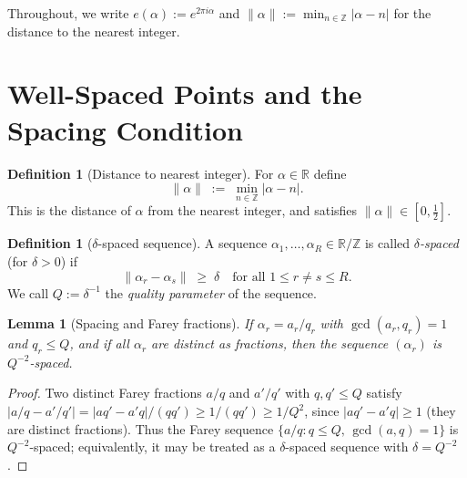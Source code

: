 \documentclass[12pt,a4paper]{amsart}
\newtheorem{lemma}[theorem]{Lemma}
\theoremstyle{definition}
\newtheorem{definition}[theorem]{Definition}
\newcommand{\Z}{\mathbb{Z}}
\newcommand{\R}{\mathbb{R}}
\newcommand{\eexp}[1]{e\!\left(#1\right)}
\begin{document}
Throughout, we write $\eexp{\alpha} := e^{2\pi i\alpha}$ and
$\|\alpha\| := \min_{n\in\Z}|\alpha - n|$ for the distance to the nearest
integer.

\section{Well-Spaced Points and the Spacing Condition}

\begin{definition}[Distance to nearest integer]
  For $\alpha \in \R$ define
  \[
    \|\alpha\| \;:=\; \min_{n \in \Z}|\alpha - n|.
  \]
  This is the distance of $\alpha$ from the nearest integer, and satisfies
  $\|\alpha\| \in [0, \tfrac{1}{2}]$.
\end{definition}

\begin{definition}[$\delta$-spaced sequence]\label{def:spaced}
  A sequence $\alpha_1, \ldots, \alpha_R \in \R/\Z$ is called
  \emph{$\delta$-spaced} (for $\delta > 0$) if
  \[
    \|\alpha_r - \alpha_s\| \;\geq\; \delta
    \quad \text{for all } 1 \leq r \neq s \leq R.
  \]
  We call $Q := \delta^{-1}$ the \emph{quality parameter} of the sequence.
\end{definition}

\begin{lemma}[Spacing and Farey fractions]\label{lem:farey}
  If $\alpha_r = a_r/q_r$ with $\gcd(a_r, q_r) = 1$ and $q_r \leq Q$,
  and if all $\alpha_r$ are distinct as fractions, then the sequence
  $(\alpha_r)$ is $Q^{-2}$-spaced.
\end{lemma}

\begin{proof}
  Two distinct Farey fractions $a/q$ and $a'/q'$ with $q, q' \leq Q$
  satisfy $|a/q - a'/q'| = |aq' - a'q|/(qq') \geq 1/(qq') \geq 1/Q^2$,
  since $|aq'-a'q| \geq 1$ (they are distinct fractions).
  Thus the Farey sequence $\{a/q : q \leq Q,\, \gcd(a,q)=1\}$ is
  $Q^{-2}$-spaced; equivalently, it may be treated as a $\delta$-spaced
  sequence with $\delta = Q^{-2}$.
\end{proof}

\end{document}
